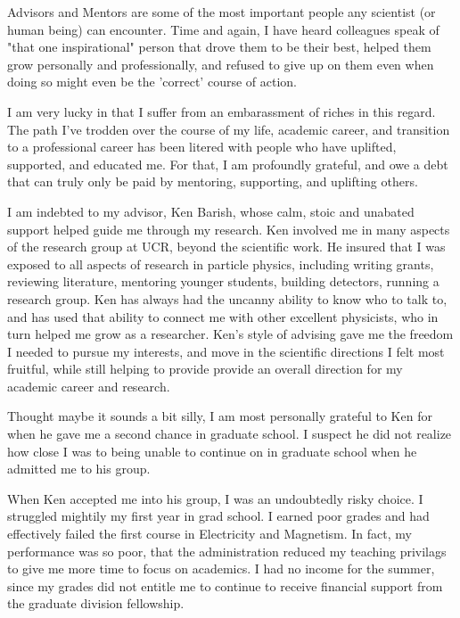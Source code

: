 Advisors and Mentors are some of the most important people any scientist (or
human being) can encounter. Time and again, I have heard colleagues speak of
"that one inspirational" person that drove them to be their best, helped them
grow personally and professionally, and refused to give up on them even when
doing so might even be the 'correct' course of action.

I am very lucky in that I suffer from an embarassment of riches in this regard.
The path I've trodden over the course of my life, academic career, and
transition to a professional career has been litered with people who have
uplifted, supported, and educated me. For that, I am profoundly grateful, and
owe a debt that can truly only be paid by mentoring, supporting, and uplifting
others.

I am indebted to my advisor, Ken Barish, whose calm, stoic and unabated support
helped guide me through my research. Ken involved me in many aspects of the
research group at UCR, beyond the scientific work. He insured that I was
exposed to all aspects of research in particle physics, including writing
grants, reviewing literature, mentoring younger students, building detectors,
running a research group.  Ken has always had the uncanny ability to know who
to talk to, and has used that ability to connect me with other excellent
physicists, who in turn helped me grow as a researcher. Ken's style of advising
gave me the freedom I needed to pursue my interests, and move in the scientific
directions I felt most fruitful, while still helping to provide provide an
overall direction for my academic career and research. 

Thought maybe it sounds a bit silly, I am most personally grateful to Ken for
when he gave me a second chance in graduate school. I suspect he did not
realize how close I was to being unable to continue on in graduate school when
he admitted me to his group.

When Ken accepted me into his group, I was an undoubtedly risky choice. I
struggled mightily my first year in grad school.  I earned poor grades and had
effectively failed the first course in Electricity and Magnetism. In fact, my
performance was so poor, that the administration reduced my teaching privilags
to give me more time to focus on academics. I had no income for the summer,
since my grades did not entitle me to continue to receive financial support
from the graduate division fellowship.


